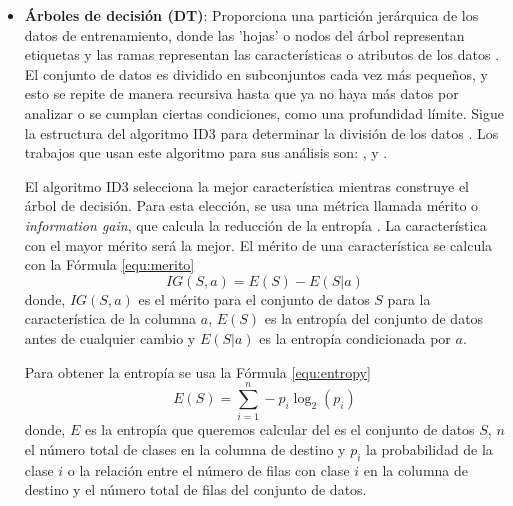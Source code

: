 \begin{itemize}
\item \textbf{Árboles de decisión (\gls{DT})}: Proporciona una partición jerárquica de los datos de entrenamiento, donde las 'hojas' o nodos del árbol representan etiquetas y las ramas representan las características o atributos de los datos \cite{141}. El conjunto de datos es dividido en subconjuntos cada vez más pequeños, y esto se repite de manera recursiva hasta que ya no haya más datos por analizar o se cumplan ciertas condiciones, como una profundidad límite. Sigue la estructura del algoritmo \gls{ID3} para determinar la división de los datos \cite{142}. Los trabajos que usan este algoritmo para sus análisis son: \cite{shallow}, \cite{rwguard} y \cite{detecting}.

El algoritmo \gls{ID3} selecciona la mejor característica mientras construye el árbol de decisión. Para esta elección, se usa una métrica llamada mérito o \textit{information gain}, que calcula la reducción de la entropía \cite{144}. La característica con el mayor mérito será la mejor. El mérito de una característica se calcula con la Fórmula \ref{equ:merito}
\begin{equation}\label{equ:merito}
IG(S,a) = E(S) - E(S | a)
\end{equation}
\noindent donde, $IG(S,a)$ es el mérito para el conjunto de datos $S$ para la característica de la columna $a$, $E(S)$ es la entropía del conjunto de datos antes de cualquier cambio y $E(S | a)$ es la entropía condicionada por $a$.



Para obtener la entropía se usa la Fórmula \ref{equ:entropy} \cite{142}
\begin{equation}\label{equ:entropy}
E(S) = \sum_{i=1}^{n} - p_i\log_2(p_i)
\end{equation}
\noindent donde, $E$ es la entropía que queremos calcular del es el conjunto de datos $S$, $n$ el número total de clases en la columna de destino y $p_i$ la probabilidad de la clase $i$ o la relación entre el número de filas con clase $i$ en la columna de destino y el número total de filas del conjunto de datos.


\end{itemize}

